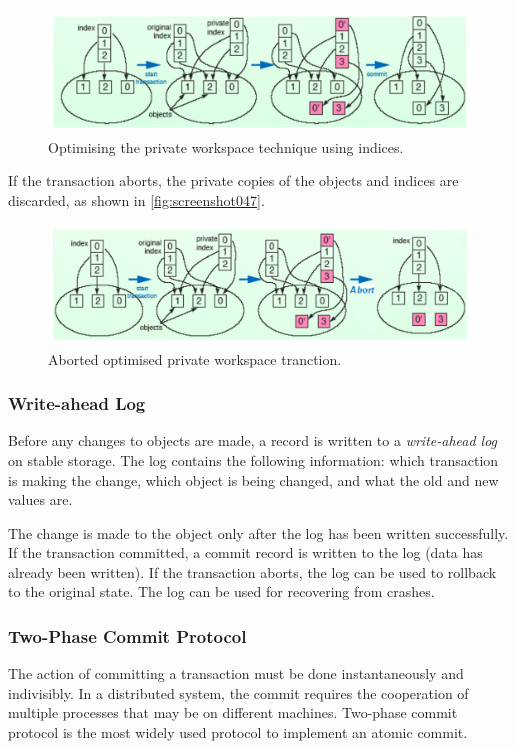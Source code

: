 \begin{figure}
\centering
\includegraphics[width=0.7\linewidth]{screenshot046}
\caption{Optimising the private workspace technique using indices.}
\label{fig:screenshot046}
\end{figure}

If the transaction aborts, the private copies of the objects and indices are discarded, as shown in \autoref{fig:screenshot047}.
\begin{figure}
\centering
\includegraphics[width=0.7\linewidth]{screenshot047}
\caption{Aborted optimised private workspace tranction.}
\label{fig:screenshot047}
\end{figure}

\subsubsection{Write-ahead Log} 
Before any changes to objects are made, a record is written to a \textit{write-ahead log} on stable storage. The log contains the following information: which transaction is making the change, which object is being changed, and what the old and new values are. 

The change is made to the object only after the log has been written successfully. If the transaction committed, a commit record is written to the log (data has already been written). If the transaction aborts, the log can be used to rollback to the original state. The log can be used for recovering from crashes. 

\subsubsection{Two-Phase Commit Protocol}
The action of committing a transaction must be done instantaneously and indivisibly. In a distributed system, the commit requires the cooperation of multiple processes that may be on different machines. Two-phase commit protocol is the most widely used protocol to implement an atomic commit. 

